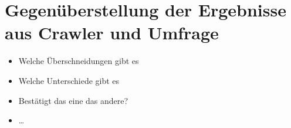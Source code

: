 \chapter{Gegenüberstellung der Ergebnisse aus Crawler und Umfrage}

\begin{itemize}
    \item Welche Überschneidungen gibt es
    \item Welche Unterschiede gibt es
    \item Bestätigt das eine das andere?
    \item \dots 
\end{itemize}